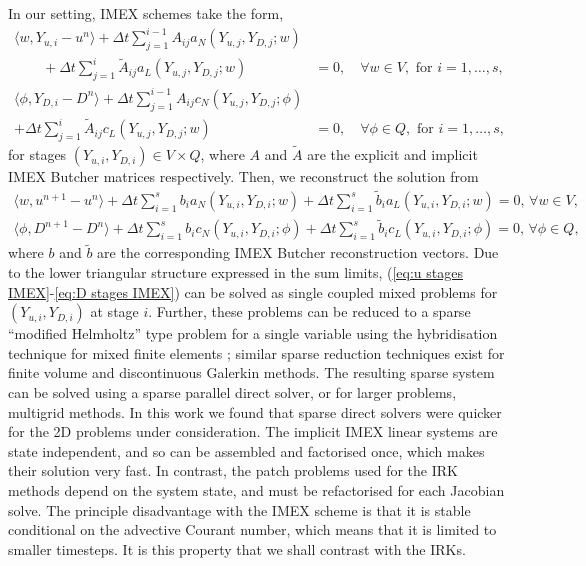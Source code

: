 \documentclass[a4paper, 12pt]{article}
\begin{document}
In our setting, IMEX schemes take the form,
\begin{align}
    \nonumber
    \langle w, Y_{u,i}-u^n \rangle + \Delta t \sum_{j=1}^{i-1} A_{ij} a_N\left(
    Y_{u,j}, Y_{D,j}; w\right) & \\
\qquad    + \Delta t \sum_{j=1}^i \tilde{A}_{ij} a_L(Y_{u,j}, Y_{D,j}; w)
    & = 0, \label{eq:u stages IMEX}
  \quad \forall w \in V,\mbox{ for }i=1,\ldots,s, \\
  \nonumber
    \langle \phi, Y_{D,i}-D^n \rangle + \Delta t \sum_{j=1}^{i-1} A_{ij} c_N\left(
    Y_{u,j}, Y_{D,j}; \phi\right) & \\
    + \Delta t \sum_{j=1}^i \tilde{A}_{ij} c_L(Y_{u,j}, Y_{D,j}; w)
    & = 0, \label{eq:D stages IMEX}
      \quad \forall \phi \in Q,\mbox{ for }i=1,\ldots,s,
\end{align}
for stages $(Y_{u,i},Y_{D,i}) \in V \times Q$,
where $A$ and $\tilde{A}$ are the explicit and implicit IMEX Butcher
matrices respectively. Then, we reconstruct the solution from
\begin{align}
  \label{eq:mass u}
  \langle w, u^{n+1} - u^n\rangle + \Delta t\sum_{i=1}^s b_i
  a_N(Y_{u,i}, Y_{D,i}; w)
  + \Delta t \sum_{i=1}^s \tilde{b}_i
  a_L(Y_{u,i}, Y_{D,i}; w)=0,\, \forall w \in V, \\
  \label{eq:mass D}
    \langle \phi, D^{n+1} - D^n\rangle + \Delta t\sum_{i=1}^s b_i
  c_N(Y_{u,i}, Y_{D,i}; \phi)
  + \Delta t \sum_{i=1}^s \tilde{b}_i
    c_L(Y_{u,i}, Y_{D,i}; \phi)=0,\, \forall \phi \in Q,
\end{align}
where $b$ and $\tilde{b}$ are the corresponding IMEX Butcher
reconstruction vectors. Due to the lower triangular structure
expressed in the sum limits, (\ref{eq:u stages IMEX}-\ref{eq:D stages
  IMEX}) can be solved as single coupled mixed problems for
$(Y_{u,i},Y_{D,i})$ at stage $i$. Further, these problems can be
reduced to a sparse ``modified Helmholtz'' type problem for a single
variable using the hybridisation technique for mixed finite elements
\citep{boffi2013mixed,cockburn2004characterization}; similar sparse
reduction techniques exist for finite volume and discontinuous
Galerkin methods. The resulting sparse system can be solved using a
sparse parallel direct solver, or for larger problems, multigrid
methods. In this work we found that sparse direct solvers were quicker
for the 2D problems under consideration. The implicit IMEX linear
systems are state independent, and so can be assembled and factorised
once, which makes their solution very fast. In contrast, the patch
problems used for the IRK methods depend on the system state, and must
be refactorised for each Jacobian solve. The principle disadvantage
with the IMEX scheme is that it is stable conditional on the advective
Courant number, which means that it is limited to smaller timesteps.
It is this property that we shall contrast with the IRKs.
\end{document}
